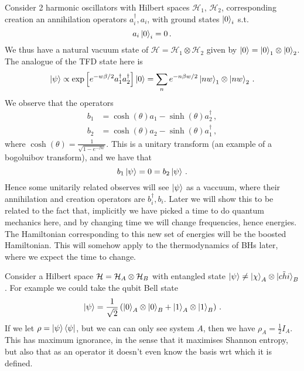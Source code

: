 \documentclass{article}
\begin{document}
\begin{remark}
	Consider 2 harmonic oscillators with Hilbert spaces $\mathcal{H}_1, \, \mathcal{H}_2$, corresponding creation an annihilation operators $a_i^\dagger, a_i$, with ground states $\ket{0}_i$ s.t. 
	\[
	a_i \ket{0}_i = 0 \, .
	\] 
	We thus have a natural vacuum state of $\mathcal{H} = \mathcal{H}_1 \otimes \mathcal{H}_2$ given by $\ket{0} = \ket{0}_1 \otimes \ket{0}_2$. The analogue of the TFD state here is 
	\[
	\ket{\psi} \propto \exp\left[ e^{-w \beta/2} a^\dagger_1 a^\dagger_2 \right] \ket{0} = \sum_n e^{-n\beta w/2 }\ket{nw}_1 \otimes \ket{nw}_2 \, .
	\]
	We observe that the operators 
	\begin{align*}
		b_1 &= \cosh(\theta) a_1 - \sinh(\theta) a_2^\dagger \, , \\
		b_2 &= \cosh(\theta) a_2 - \sinh(\theta) a_1^\dagger \, ,
	\end{align*}
where $\cosh(\theta) = \frac{1}{\sqrt{1-e^{-\beta w}}}$. This is a unitary transform (an example of a bogoluibov transform), and we have that 
\[
b_1 \ket{\psi} = 0 = b_2 \ket{\psi} \, . 
\]
Hence some unitarily related observes will see $\ket{\psi}$ as a vaccuum, where their annihilation and creation operators are $b_i^\dagger, b_i$. Later we will show this to be related to the fact that, implicitly we have picked a time to do quantum mechanics here, and by changing time we will change frequencies, hence energies. The Hamiltonian corresponding to this new set of energies will be the boosted Hamiltonian. This will somehow apply to the thermodynamics of BHs later, where we expect the time to change. 
\end{remark}

\begin{remark}
	Consider a Hilbert space $\mathcal{H} = \mathcal{H}_A \otimes \mathcal{H}_B$ with entangled state $\ket{\psi} \neq \ket{\chi}_A \otimes \ket{\tilde{chi}}_B$. For example we could take the qubit Bell state 
\[
\ket{\psi} = \frac{1}{\sqrt{2}} \left( \ket{0}_A \otimes \ket{0}_B + \ket{1}_A \otimes \ket{1}_B \right) \, .
\]
If we let $\rho = \ket{\psi} \bra{\psi}$, but we can can only see system $A$, then we have $\rho_A = \frac{1}{2} I_A$. This has maximum ignorance, in the sense that it maximises Shannon entropy, but also that as an operator it doesn't even know the basis wrt which it is defined.  
\end{remark}
\end{document}
